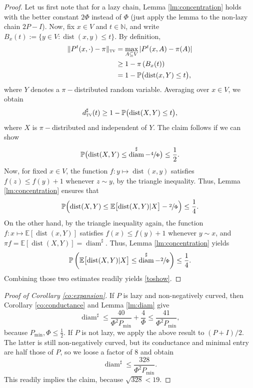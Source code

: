\documentclass[10pt]{amsart}
\theoremstyle{definition}
\newcommand{\dN}{\mathbb {N}}
\newcommand{\EE}{{\mathbb{E}}}
\newcommand{\PP}{{\mathbb{P}}}
\newcommand{\dtv}{d_{\textup{\textsc{tv}}}}
\newcommand{\tv}{\textup{\textsc{tv}}}
\newcommand{\pmin}{P_{\mathrm{min}}}
\DeclareMathOperator{\diam}{diam}
\DeclareMathOperator{\dist}{dist}
\begin{document}
\begin{proof}Let us first note that for a lazy chain, Lemma \ref{lm:concentration} holds with the better constant $2\Phi$ instead of $\Phi$ (just apply the lemma to the non-lazy chain $2P-I$). Now, fix $x\in V$ and $t\in\dN$, and write $B_x(t):=\{y\in V\colon \dist(x,y)\le t\}$. By definition,
\begin{align*}
\|P^t(x,\cdot)-\pi\|_\tv & = \max_{A\subseteq V}|P^t(x,A)-\pi(A)|\\
& \ge 1-\pi\left(B_x(t)\right)\\
& = 1-\PP \bigl(\dist(x,Y)\le t \bigr),
\end{align*}
where $Y$ denotes a $\pi-$distributed random variable. Averaging over $x\in V$, we obtain
\begin{equation*}
\dtv^\sharp(t) \ge 1-\PP\bigl(\dist(X,Y)\le t \bigr),
\end{equation*}
where $X$ is $\pi-$distributed and independent of $Y$. The claim follows if we can show
\begin{equation}
\label{toshow}
\PP \bigl(\dist(X,Y)\le \diam^\sharp-\sfrac{4}{\Phi} \bigr) \le \frac 12.
\end{equation}
Now, for fixed $x\in V$, the function $f\colon y\mapsto \dist(x,y)$ satisfies $f(z)\le f(y)+1$ whenever $z\sim y$, by the triangle inequality. Thus, Lemma \ref{lm:concentration} ensures that
\begin{equation*}
\PP\Bigl(\dist(X,Y)\le \EE \bigl[\dist(X,Y)|X \bigr]-\sfrac{2}{\Phi}\Bigr) \le \frac{1}{4}.
\end{equation*}
On the other hand, by the triangle inequality again, the function $f\colon x\mapsto \EE[\dist(x,Y)]$ satisfies $f(x)\le f(y)+1$ whenever $y\sim x$, and $\pi f=\EE[\dist(X,Y)]=\diam^\sharp$. Thus, Lemma \ref{lm:concentration} yields
\begin{equation*}
\PP\left(\EE \bigl[\dist(X,Y)|X \bigr]\le \diam^\sharp-\sfrac{2}{\Phi}\right) \le \frac{1}{4}.
\end{equation*}
Combining those two estimates readily yields \eqref{toshow}.
\end{proof}

\begin{proof}[Proof of Corollary \ref{co:expansion}]If $P$ is lazy and non-negatively curved, then Corollary \ref{co:conductance} and Lemma \ref{lm:diam} give
\begin{equation*}
\diam^\sharp \le \frac{40}{\Phi^2\pmin}+\frac{4}{\Phi} \le \frac{41}{\Phi^2\pmin},
\end{equation*}
because $\pmin,\Phi\le \frac 12$. If $P$ is not lazy, we apply the above result to $(P+I)/2$. The latter is still non-negatively curved, but its conductance and minimal entry are half those of $P$, so we loose a factor of $8$ and obtain
\begin{equation*}
\diam^\sharp \le \frac{328}{\Phi^2\pmin}.
\end{equation*}
This readily implies the claim, because $\sqrt{328}<19$.
\end{proof}
\end{document}
